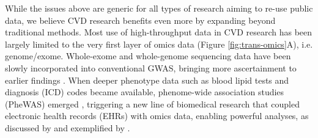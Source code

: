 \documentclass[letter]{bioinfo}
\begin{document}
	While the issues above are generic for all types of research aiming to re-use public data, we believe CVD research benefits even more by expanding beyond traditional methods. Most use of high-throughput data in CVD research has been largely limited to the very first layer of omics data (Figure \ref{fig:trans-omics}A), i.e. genome/exome. Whole-exome and whole-genome sequencing data have been slowly incorporated into conventional GWAS, bringing more ascertainment to earlier findings \citep{Cohen:2006:Sequence,Dewey:2016:Inactivating,CARDIoGRAM:2016:Coding,NHLBI:2014:LossofFunction}. When deeper phenotype data such as blood lipid tests and diagnosis (ICD) codes became available, phenome-wide association studies (PheWAS) emerged \citep{Denny:2013:Systematic}, triggering a new line of biomedical research that coupled electronic health records (EHRs) with omics data, enabling powerful analyses, as discussed by  \cite{Denaxas:2015:Big, Wu:2017:Omic} and exemplified by \cite{Dewey:2016:Distribution,Li:2018:Decoding}. 
\end{document}
